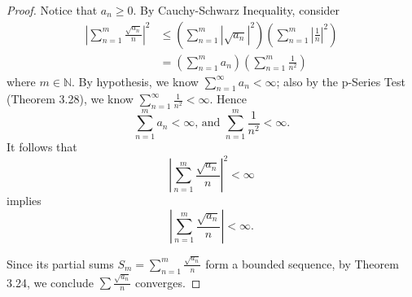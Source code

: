 \begin{Exercise}
	\begin{proof}
		Notice that $a_n\geq 0$. By Cauchy-Schwarz Inequality, consider
		\begin{align*}
		\left| \sum_{n=1}^{m} \frac{\sqrt{a_n}}{n} \right|^2
		&\leq 
		\left( \sum_{n=1}^{m} \left| \sqrt{a_n} \right|^2 \right)
		\left( \sum_{n=1}^{m} \left| \frac{1}{n} \right|^2 \right) \\
		&= \left( \sum_{n=1}^{m} a_n \right) \left( \sum_{n=1}^{m} \frac{1}{n^2} \right)
		\end{align*}
		where $m\in\mathbb{N}$. By hypothesis, we know $\sum_{n=1}^{\infty} a_n < \infty$; also by the p-Series Test (Theorem 3.28), we know $\sum_{n=1}^{\infty} \frac{1}{n^2} < \infty$. Hence 
		$$
		\sum_{n=1}^{m} a_n<\infty\text{, and }\sum_{n=1}^{m} \frac{1}{n^2} < \infty.
		$$
		It follows that
		$$
		\left| \sum_{n=1}^{m} \frac{\sqrt{a_n}}{n} \right|^2 < \infty
		$$
		implies
		$$
		\left| \sum_{n=1}^{m} \frac{\sqrt{a_n}}{n} \right| < \infty.
		$$
		
		Since its partial sums $S_m = \sum_{n=1}^{m} \frac{\sqrt{a_n}}{n}$ form a bounded sequence, by Theorem 3.24, we conclude $\sum \frac{\sqrt{a_n}}{n}$ converges.
	\end{proof}
\end{Exercise}